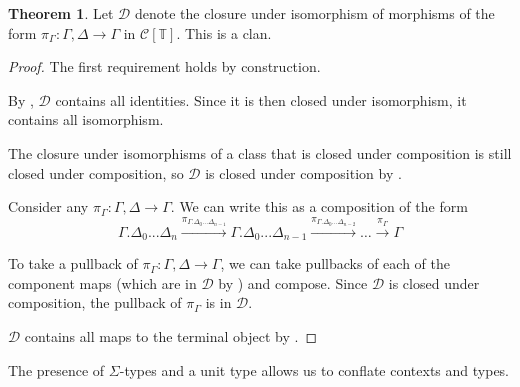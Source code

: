 \documentclass{article}
\theoremstyle{definition}
\theoremstyle{theorem}
\newtheorem{theorem}{Theorem}[section]
\newcommand{\T}{\mathbb T}
\newcommand{\C}{\mathcal C}
\newcommand{\D}{\mathcal D}
\newcommand{\syncat}[1]{\C [#1]}
\begin{document}
\begin{theorem}\label{thm:syn-clan}
    Let $\mathcal D$ denote the closure under isomorphism of morphisms of the form $\pi_\Gamma : \Gamma, \Delta \to \Gamma$ in $\syncat{\T}$. This is a clan.
\end{theorem}
\begin{proof}
    The first requirement holds by construction.
    
    By , $\D$ contains all identities. Since it is then closed under isomorphism, it contains all isomorphism.

    The closure under isomorphisms of a class that is closed under composition is still closed under composition, so $\D$ is closed under composition by .

    Consider any $\pi_\Gamma : \Gamma, \Delta \to \Gamma$. We can write this as a composition of the form 
    \[ \Gamma.\Delta_0 ... \Delta_n \xrightarrow{\pi_{\Gamma.\Delta_0...\Delta_{n-1}}} \Gamma.\Delta_0...\Delta_{n-1} \xrightarrow{\pi_{\Gamma.\Delta_0...\Delta_{n-2}}} \hdots \xrightarrow{\pi_{\Gamma}} \Gamma \] 

    To take a pullback of $\pi_\Gamma : \Gamma, \Delta \to \Gamma$, we can take pullbacks of each of the component maps (which are in $\D$ by ) and compose. Since $\D$ is closed under composition, the pullback of $\pi_\Gamma $ is in $\D$.

    $\D$ contains all maps to the terminal object by .
\end{proof}

The presence of $\Sigma$-types and a unit type allows us to conflate contexts and types.
\end{document}
